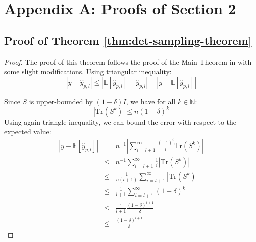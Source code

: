 
\section*{Appendix A: Proofs of Section 2}


\subsection{Proof of Theorem \ref{thm:det-sampling-theorem}}

\label{sub:det-sampling-proof}

\begin{proof} The proof of this theorem follows the proof of the
Main Theorem in \cite{Barry1999} with some slight modifications.
Using triangular inequality: 
\[
\left|y-\hat{y}_{p,l}\right|\leq\left|\mathbb{E}\left[\hat{y}_{p,l}\right]-\hat{y}_{p,l}\right|+\left|y-\mathbb{E}\left[\hat{y}_{p,l}\right]\right|
\]


Since $S$ is upper-bounded by $\left(1-\delta\right)I$, we have
for all $k\in\mathbb{N}$: 
\[
\left|\mbox{Tr}\left(S^{k}\right)\right|\leq n\left(1-\delta\right)^{k}
\]
Using again triangle inequality, we can bound the error with respect
to the expected value: 
\begin{eqnarray*}
\left|y-\mathbb{E}\left[\hat{y}_{p,l}\right]\right| & = & n^{-1}\left|\sum_{i=l+1}^{\infty}\frac{\left(-1\right)^{i}}{i}\mbox{Tr}\left(S^{k}\right)\right|\\
 & \leq & n^{-1}\sum_{i=l+1}^{\infty}\frac{1}{i}\left|\mbox{Tr}\left(S^{k}\right)\right|\\
 & \leq & \frac{1}{n\left(l+1\right)}\sum_{i=l+1}^{\infty}\left|\mbox{Tr}\left(S^{k}\right)\right|\\
 & \leq & \frac{1}{l+1}\sum_{i=l+1}^{\infty}\left(1-\delta\right)^{k}\\
 & \leq & \frac{1}{l+1}\frac{\left(1-\delta\right)^{l+1}}{\delta}\\
 & \leq & \frac{\left(1-\delta\right)^{l+1}}{\delta}
\end{eqnarray*}



\end{proof}
